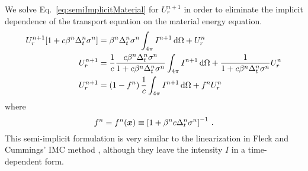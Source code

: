 We solve Eq.~\eqref{eq:semiImplicitMaterial} for $U_r^{n+1}$ in order to
eliminate the implicit dependence of the transport equation on the material
energy equation.
\begin{align} \nonumber
  U_r^{n+1} [ 1 + c \beta^n \Delta_t^n \sigma^n ]
  &= \beta^n \Delta_t^n \sigma^n\int_{4\pi} I^{n+1}\mathop{}\!\mathrm{d} \Omega + U_r^n
   \\ \nonumber
  U_r^{n+1}
  &= \frac1c \frac{ c \beta^n \Delta_t^n \sigma^n }{ 1 + c \beta^n \Delta_t^n \sigma^n}
  \int_{4\pi} I^{n+1}\mathop{}\!\mathrm{d} \Omega + \frac1{ 1 + c \beta^n \Delta_t^n \sigma^n}
  U_r^n
  \\ \label{eq:urNPlusOne}
  U_r^{n+1}
  &= \left(1 - f^n\right) \frac1c \int_{4\pi} I^{n+1}\mathop{}\!\mathrm{d} \Omega + f^n U_r^n
\end{align}
where
\begin{equation} \label{eq:fleckFactor}
  f^n = f^n(\bm{x}) \equiv \left[ 1 + \beta^n c \Delta_t^n \sigma^n
  \right]^{-1} \,.
\end{equation}
This semi-implicit formulation is very similar to the linearization in Fleck
and Cummings' IMC method \cite{Fle1971}, although they leave the intensity $I$
in a time-dependent form.

